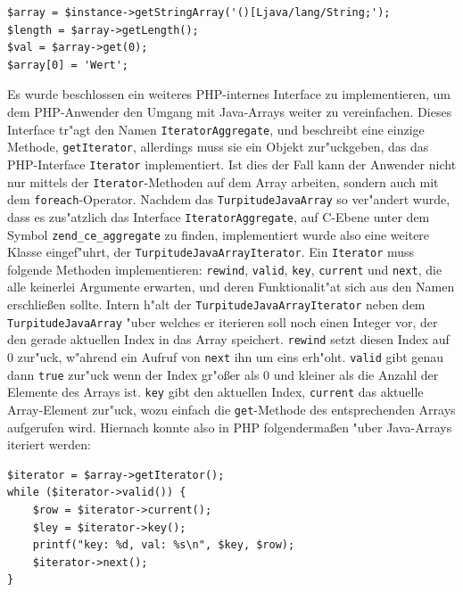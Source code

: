 \begin{lstlisting}[caption=Zugriff auf ein Java-Array]
$array = $instance->getStringArray('()[Ljava/lang/String;');
$length = $array->getLength();
$val = $array->get(0);
$array[0] = 'Wert';
\end{lstlisting}

Es wurde beschlossen ein weiteres PHP-internes Interface zu implementieren, um dem PHP-Anwender den Umgang mit Java-Arrays weiter zu vereinfachen.
Dieses Interface tr"agt den Namen \texttt{IteratorAggregate},
und beschreibt eine einzige Methode, \texttt{getIterator}, allerdings muss sie ein Objekt zur"uckgeben, das das PHP-Interface \texttt{Iterator} implementiert.
Ist dies der Fall kann der Anwender nicht nur mittels der \texttt{Iterator}-Methoden auf dem Array arbeiten, sondern auch mit dem \texttt{foreach}-Operator. Nachdem
das \texttt{TurpitudeJavaArray} so ver"andert wurde, dass es zus"atzlich das Interface \texttt{IteratorAggregate}, auf C-Ebene unter dem Symbol \texttt{zend\_ce\_aggregate}
zu finden, implementiert wurde also eine weitere Klasse eingef"uhrt, der \texttt{TurpitudeJavaArrayIterator}. Ein \texttt{Iterator} muss folgende Methoden implementieren:
\texttt{rewind}, \texttt{valid}, \texttt{key}, \texttt{current} und \texttt{next}, die alle keinerlei Argumente erwarten, und deren Funktionalit"at sich aus den Namen erschlie\ss en 
sollte. Intern h"alt der \texttt{TurpitudeJavaArrayIterator} neben dem \texttt{TurpitudeJavaArray} "uber welches er iterieren soll noch einen Integer vor, der den
gerade aktuellen Index in das Array speichert. \texttt{rewind} setzt diesen Index auf 0 zur"uck, w"ahrend ein Aufruf von \texttt{next} ihn um eins erh"oht. \texttt{valid} gibt
genau dann \texttt{true} zur"uck wenn der Index gr"o\ss er als 0 und kleiner als die Anzahl der Elemente des Arrays ist. \texttt{key} gibt den aktuellen Index, \texttt{current}
das aktuelle Array-Element zur"uck, wozu einfach die \texttt{get}-Methode des entsprechenden Arrays aufgerufen wird. Hiernach konnte also in PHP folgenderma\ss en "uber Java-Arrays
iteriert werden:
\clearpage

\begin{lstlisting}[caption=Iterieren "uber ein Java-Array]
$iterator = $array->getIterator();
while ($iterator->valid()) {
    $row = $iterator->current();
    $ley = $iterator->key();
    printf("key: %d, val: %s\n", $key, $row);
    $iterator->next();
}
\end{lstlisting}

